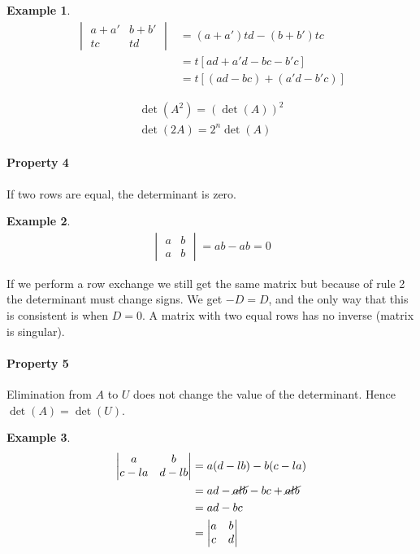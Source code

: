 \documentclass[12pt, letterpaper]{article}
\theoremstyle{definition}
\newtheorem{example}{Example}
\begin{document}
	\begin{example}
		\begin{align*}
			\begin{vmatrix}
				a+a' & b+b' \\
				tc & td		
			\end{vmatrix} &= (a + a')td - (b + b')tc \\
			              &= t\left[ ad + a'd - bc - b'c \right] \\
			              &=  t\left[ (ad- bc)  + (a'd - b'c )\right]
		\end{align*}
	\end{example}

	\begin{gather*}
		\det(A^2) = (\det(A))^2 \\
		\det(2A) = 2^n \det(A)
		\end{gather*}


\paragraph{Property 4}
If two rows are equal, the determinant is zero.
	\begin{example}
		\begin{gather*}
			\begin{vmatrix}
				a & b \\
				a & b 
			\end{vmatrix} = ab - ab = 0
		\end{gather*}
	\end{example}

	If we perform a row exchange we still get the same matrix but because of rule 2 the determinant must change signs. We get $-D = D$, and the only way that this is consistent is when $D = 0$. A matrix with two equal rows has no inverse (matrix is singular). 
	
	
	
\paragraph{Property 5}
Elimination from $A$ to $U$ does not change the value of the determinant. Hence $\det(A) = \det(U)$.

	\begin{example}
		\begin{align*}
			\begin{vmatrix}
				a & b\\
				c - la & d - lb
			\end{vmatrix} &= a(d - lb) - b(c - la) \\
						  &= ad - \cancel{alb} - bc + \cancel{alb} \\
						  &= ad - bc \\
						  &= \begin{vmatrix}
						  			a & b\\
						  			c & d
						     \end{vmatrix}
		\end{align*}
	\end{example}
\end{document}
